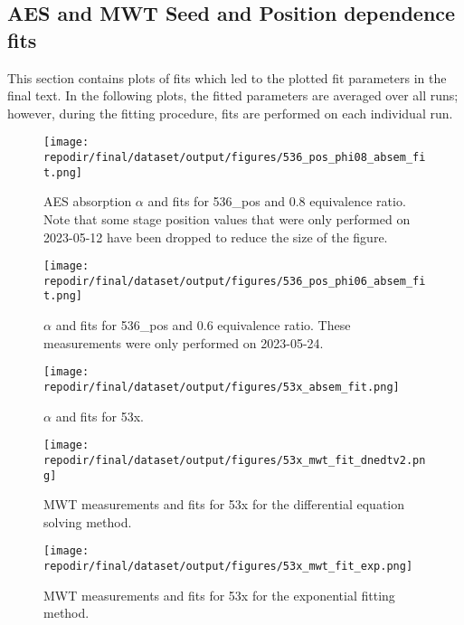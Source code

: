 \clearpage
\subsection{AES and MWT Seed and Position dependence fits}

This section contains plots of fits which led to the plotted fit parameters in the final text. In the following plots, the fitted parameters are averaged over all runs; however, during the fitting procedure, fits are performed on each individual run. 

\begin{figure}[]
\centering
\texttt{[image: \\repodir/final/dataset/output/figures/536\_pos\_phi08\_absem\_fit.png]}
\caption{AES absorption $\alpha$ and fits for 536\_pos and 0.8 equivalence ratio. Note that some stage position values that were only performed on 2023-05-12 have been dropped to reduce the size of the figure. }
\label{fig:SI_536_pos_phi08_absem_fit}
\end{figure}

\begin{figure}[]
\centering
\texttt{[image: \\repodir/final/dataset/output/figures/536\_pos\_phi06\_absem\_fit.png]}
\caption{$\alpha$ and fits for 536\_pos and 0.6 equivalence ratio. These measurements were only performed on 2023-05-24.}
\label{fig:SI_536_pos_phi06_absem_fit}
\end{figure}

\begin{figure}[]
\centering
\texttt{[image: \\repodir/final/dataset/output/figures/53x\_absem\_fit.png]}
\caption{$\alpha$ and fits for 53x.}
\label{fig:SI_53x_absem_fit}
\end{figure}

\begin{figure}[]
\centering
\texttt{[image: \\repodir/final/dataset/output/figures/53x\_mwt\_fit\_dnedtv2.png]}
\caption{MWT measurements and fits for 53x for the differential equation solving method. }
\label{fig:SI_53x_mwt_fit_dnedtv2}%
\end{figure}

\begin{figure}[]
\centering
\texttt{[image: \\repodir/final/dataset/output/figures/53x\_mwt\_fit\_exp.png]}
\caption{MWT measurements and fits for 53x for the exponential fitting method. }
\label{fig:SI_53x_mwt_fit_exp}
\end{figure}%
